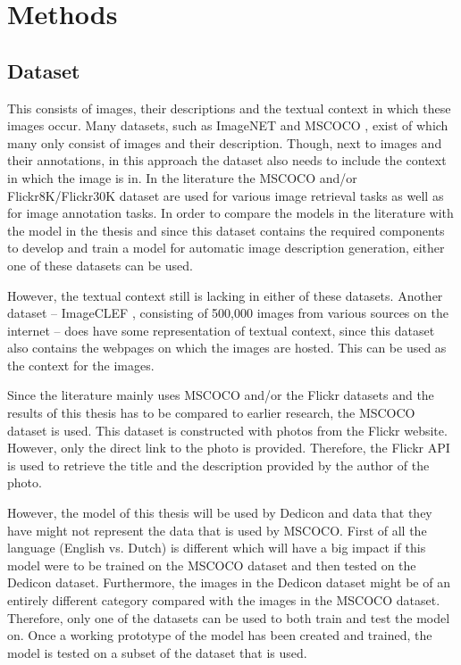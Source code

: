 \section{Methods}
\label{sec:methods}

\subsection{Dataset}
This consists of images, their descriptions and the textual context in which these images occur. Many datasets, such as ImageNET \cite{Russakovsky2012} and MSCOCO \cite{Lin2014}, exist of which many only consist of images and their description. Though, next to images and their annotations, in this approach the dataset also needs to include the context in which the image is in. In the literature the MSCOCO and/or Flickr8K/Flickr30K dataset are used for various image retrieval tasks as well as for image annotation tasks. In order to compare the models in the literature with the model in the thesis and since this dataset contains the required components to develop and train a model for automatic image description generation, either one of these datasets can be used. 

However, the textual context still is lacking in either of these datasets. Another dataset -- ImageCLEF \cite{Gilbert15_CLEF}, consisting of 500,000 images  from various sources on the internet -- does have some representation of textual context, since this dataset also contains the webpages on which the images are hosted. This can be used as the context for the images.

Since the literature mainly uses MSCOCO and/or the Flickr datasets and the results of this thesis has to be compared to earlier research, the MSCOCO dataset is used. This dataset is constructed with photos from the Flickr website. However, only the direct link to the photo is provided. Therefore, the Flickr API is used to retrieve the title and the description provided by the author of the photo.

However, the model of this thesis will be used by Dedicon and data that they have might not represent the data that is used by MSCOCO. First of all the language (English vs. Dutch) is different which will have a big impact if this model were to be trained on the MSCOCO dataset and then tested on the Dedicon dataset. Furthermore, the images in the Dedicon dataset might be of an entirely different category compared with the images in the MSCOCO dataset. Therefore, only one of the datasets can be used to both train and test the model on. Once a working prototype of the model has been created and trained, the model is tested on a subset of the dataset that is used. 

